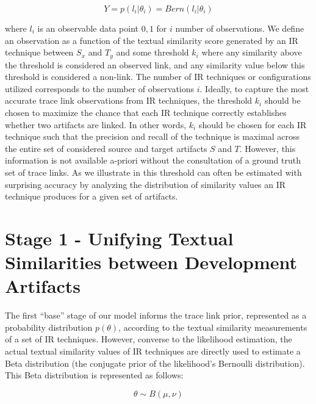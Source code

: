 \begin{equation}\label{eq:likelihood}
Y = p(l_i|\theta_i)= Bern(l_i|\theta_i)
\end{equation}

\noindent {} where $l_i$ is an observable data point ${0,1}$ for $i$ number of observations. We define an observation as a function of the textual similarity score generated by an IR technique between $S_x$ and $T_y$ and some threshold $k_i$ where any similarity above the threshold is considered an observed link, and any similarity value below this threshold is considered a non-link. The number of IR techniques or configurations utilized corresponds to the number of observations $i$.  Ideally, to capture the most accurate trace link observations from IR techniques, the threshold $k_i$ should be chosen to maximize the chance that each IR technique correctly establishes whether two artifacts are linked.  In other words, $k_i$ should be chosen for each IR technique such that the precision and recall of the technique is maximal across the entire set of considered source and target artifacts $S$ and $T$.  However, this information is not available a-priori without the consultation of a ground truth set of trace links. As we illustrate in   this threshold can often be estimated with surprising accuracy by analyzing the distribution of similarity values an IR technique produces for a given set of artifacts. 


\section{Stage 1 - Unifying Textual Similarities between Development Artifacts}
\label{sec:model-comp1}

The first ``base'' stage of our model informs the trace link prior, represented as a probability distribution $p(\theta)$, according to the textual similarity measurements of a set of IR techniques.  However, converse to the likelihood estimation, the actual textual similarity values of IR techniques are directly used to estimate a Beta distribution (the conjugate prior of the likelihood's Bernoulli distribution). This Beta distribution is represented as follows: 

\begin{equation}\label{eq:lvl1-dist}
\theta \sim B(\mu, \nu) 
\end{equation}

